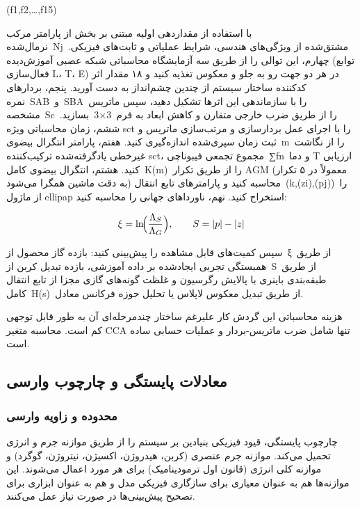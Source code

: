\documentclass[12pt, a4paper]{article}
\begin{document}
(f1,f2,…,f15)

با استفاده از مقداردهی اولیه مبتنی بر بخش از پارامتر مرکب نرمال‌شده Nj مشتق‌شده از ویژگی‌های هندسی، شرایط عملیاتی و ثابت‌های فیزیکی. چهارم، این توالی را از طریق سه آزمایشگاه محاسباتی شبکه عصبی آموزش‌دیده (توابع فعال‌سازی L، T، E) در هر دو جهت رو به جلو و معکوس تغذیه کنید و ۱۸ مقدار اثر کدکننده ساختار سیستم از چندین چشم‌انداز به دست آورید. پنجم، بردارهای نمره SAB و SBA را با سازماندهی این اثرها تشکیل دهید، سپس ماتریس مشخصه Sc را از طریق ضرب خارجی متقارن و کاهش ابعاد به فرم 3×3 بسازید. ششم، زمان محاسباتی ویژه sct را با اجرای عمل بردارسازی و مرتب‌سازی ماتریس و ثبت زمان سپری‌شده اندازه‌گیری کنید. هفتم، پارامتر انتگرال بیضوی m را از نگاشت غیرخطی یادگرفته‌شده ترکیب‌کننده sct، مجموع تجمعی فیبوناچی ∑fn و دما T ارزیابی کنید. هشتم، انتگرال بیضوی کامل K(m) را از طریق تکرار AGM (معمولاً در ۵ تکرار به دقت ماشین همگرا می‌شود) محاسبه کنید و پارامترهای تابع انتقال (k,(zi),(pj)) را از ماژول ellipap استخراج کنید. نهم، ناورداهای جهانی را محاسبه کنید:

\begin{equation}
\xi=\ln\!\Bigl(\frac{\Lambda_{S}}{\Lambda_{G}}\Bigr),\qquad S=\lvert p\rvert-\lvert z\rvert
\end{equation}

سپس کمیت‌های قابل مشاهده را پیش‌بینی کنید: بازده گاز محصول از ξ از طریق همبستگی تجربی ایجادشده بر داده آموزشی، بازده تبدیل کربن از S از طریق طبقه‌بندی باینری با پالایش رگرسیون و غلظت گونه‌های گازی مجزا از تابع انتقال کامل H(s) از طریق تبدیل معکوس لاپلاس یا تحلیل حوزه فرکانس معادل.

هزینه محاسباتی این گردش کار علیرغم ساختار چندمرحله‌ای آن به طور قابل توجهی کم است. محاسبه متغیر CCA تنها شامل ضرب ماتریس-بردار و عملیات حسابی ساده است.

\subsection{معادلات پایستگی و چارچوب وارسی}

\subsubsection{محدوده و زاویه وارسی}

چارچوب پایستگی، قیود فیزیکی بنیادین بر سیستم را از طریق موازنه جرم و انرژی تحمیل می‌کند. موازنه جرم عنصری (کربن، هیدروژن، اکسیژن، نیتروژن، گوگرد) و موازنه کلی انرژی (قانون اول ترمودینامیک) برای هر مورد اعمال می‌شوند. این موازنه‌ها هم به عنوان معیاری برای سازگاری فیزیکی مدل و هم به عنوان ابزاری برای تصحیح پیش‌بینی‌ها در صورت نیاز عمل می‌کنند.
\end{document}
